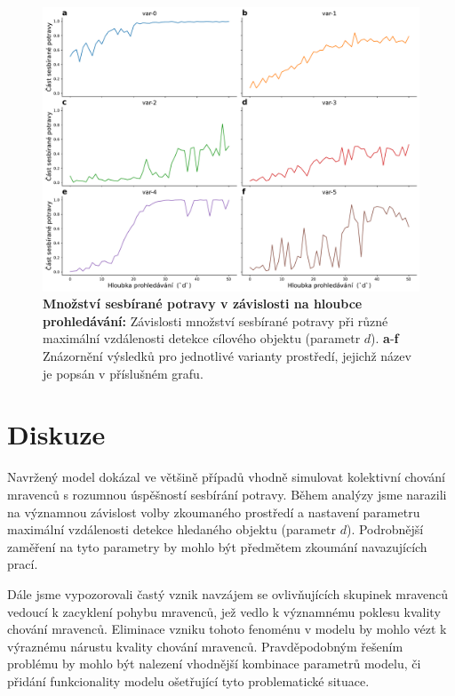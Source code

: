 \documentclass[10pt,a4paper,twocolumn]{article}
\begin{document}
\begin{figure}[tb]
  \centering
  \includegraphics[width=0.98\linewidth]{images/search_depth_variants_separated.pdf}
  \caption{\textbf{Množství sesbírané potravy v závislosti na hloubce prohledávání:}
  Závislosti množství sesbírané potravy
  při různé maximální vzdálenosti detekce cílového objektu (parametr $d$).
  \textbf{a}-\textbf{f} 
  Znázornění výsledků pro jednotlivé varianty prostředí, jejichž název je popsán
  v příslušném grafu.}
  \label{fig:search_depth_separated}
\end{figure}


\section{Diskuze}
Navržený model dokázal ve většině případů vhodně simulovat kolektivní
chování mravenců s rozumnou úspěšností sesbírání potravy. Během analýzy 
jsme narazili na významnou závislost volby zkoumaného prostředí a 
nastavení parametru maximální vzdálenosti detekce hledaného objektu
(parametr $d$). Podrobnější zaměření na tyto parametry by mohlo být 
předmětem zkoumání navazujících prací. 

Dále jsme vypozorovali častý vznik navzájem se ovlivňujících skupinek 
mravenců vedoucí k zacyklení pohybu mravenců, jež vedlo k významnému
poklesu kvality chování mravenců. Eliminace vzniku tohoto
fenoménu v modelu by mohlo vézt k výraznému nárustu kvality chování 
mravenců. Pravděpodobným řešením problému by mohlo být nalezení 
vhodnější kombinace parametrů modelu, či přidání funkcionality
modelu ošetřující tyto problematické situace.
\end{document}

